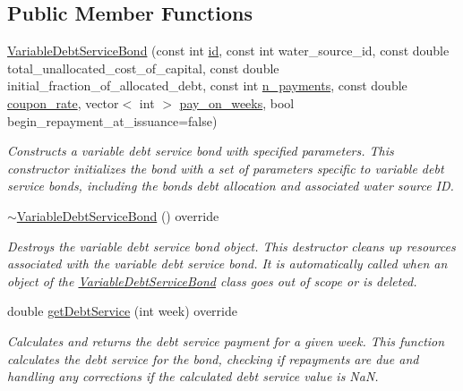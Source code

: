 \subsection*{Public Member Functions}
\begin{DoxyCompactItemize}
\item 
\mbox{\hyperlink{classVariableDebtServiceBond_adc0d18eba4f4a7c7d359640131225f55}{Variable\+Debt\+Service\+Bond}} (const int \mbox{\hyperlink{classBond_a7f75bcafbc16676ad6dbafbf40afae4a}{id}}, const int water\+\_\+source\+\_\+id, const double total\+\_\+unallocated\+\_\+cost\+\_\+of\+\_\+capital, const double initial\+\_\+fraction\+\_\+of\+\_\+allocated\+\_\+debt, const int \mbox{\hyperlink{classBond_a4a227b6de2eeada118d82ab1633b1db8}{n\+\_\+payments}}, const double \mbox{\hyperlink{classBond_a5f66785534e24caa43d9f730130a6463}{coupon\+\_\+rate}}, vector$<$ int $>$ \mbox{\hyperlink{classBond_ae8dd46fcbf95c993460ffe4ea1f52739}{pay\+\_\+on\+\_\+weeks}}, bool begin\+\_\+repayment\+\_\+at\+\_\+issuance=false)
\begin{DoxyCompactList}\small\item\em Constructs a variable debt service bond with specified parameters. This constructor initializes the bond with a set of parameters specific to variable debt service bonds, including the bond\textquotesingle{}s debt allocation and associated water source ID. \end{DoxyCompactList}\item 
\mbox{\hyperlink{classVariableDebtServiceBond_a8259b64265dd9701ac5888e0fe0bc565}{$\sim$\+Variable\+Debt\+Service\+Bond}} () override
\begin{DoxyCompactList}\small\item\em Destroys the variable debt service bond object. This destructor cleans up resources associated with the variable debt service bond. It is automatically called when an object of the {\ttfamily \mbox{\hyperlink{classVariableDebtServiceBond}{Variable\+Debt\+Service\+Bond}}} class goes out of scope or is deleted. \end{DoxyCompactList}\item 
double \mbox{\hyperlink{classVariableDebtServiceBond_a575a9a41df38e005ba0a1cff3eb2b921}{get\+Debt\+Service}} (int week) override
\begin{DoxyCompactList}\small\item\em Calculates and returns the debt service payment for a given week. This function calculates the debt service for the bond, checking if repayments are due and handling any corrections if the calculated debt service value is NaN. \end{DoxyCompactList}\item 

\end{DoxyCompactItemize}

